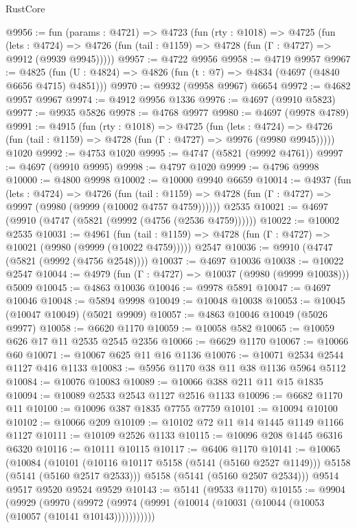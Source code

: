 \begin{lexlean}{RustCore}
\begin{coremodule}
@9956 := fun (params : @4721) =>
  @4723
    (fun (rty : @1018) =>
    @4725
      (fun (lets : @4724) =>
      @4726 (fun (tail : @1159) => @4728 (fun (Γ : @4727) => @9912 (@9939 @9945)))))
@9957 := @4722 @9956
@9958 := @4719 @9957
@9967 := @4825 (fun (U : @4824) => @4826 (fun (t : @7) => @4834 (@4697 (@4840 @6656 @4715) @4851)))
@9970 := @9932 (@9958 @9967) @6654
@9972 := @4682 @9957 @9967
@9974 := @4912 @9956 @1336
@9976 := @4697 (@9910 @5823)
@9977 := @9935 @5826
@9978 := @4768 @9977
@9980 := @4697 (@9978 @4789)
@9991 := @4915
    (fun (rty : @1018) =>
    @4725
      (fun (lets : @4724) =>
      @4726 (fun (tail : @1159) => @4728 (fun (Γ : @4727) => @9976 (@9980 @9945)))))
    @1020
@9992 := @4753 @1020
@9995 := @4747 (@5821 (@9992 @4761))
@9997 := @4697 (@9910 @9995)
@9998 := @4797 @1020
@9999 := @4796 @9998
@10000 := @4800 @9998
@10002 := @10000 @9940 @6659
@10014 := @4937
    (fun (lets : @4724) =>
    @4726
      (fun (tail : @1159) => @4728 (fun (Γ : @4727) => @9997 (@9980 (@9999 (@10002 @4757 @4759))))))
    @2535
@10021 := @4697 (@9910 (@4747 (@5821 (@9992 (@4756 (@2536 @4759))))))
@10022 := @10002 @2535
@10031 := @4961
    (fun (tail : @1159) => @4728 (fun (Γ : @4727) => @10021 (@9980 (@9999 (@10022 @4759)))))
    @2547
@10036 := @9910 (@4747 (@5821 (@9992 (@4756 @2548))))
@10037 := @4697 @10036
@10038 := @10022 @2547
@10044 := @4979 (fun (Γ : @4727) => @10037 (@9980 (@9999 @10038))) @5009
@10045 := @4863 @10036
@10046 := @9978 @5891
@10047 := @4697 @10046
@10048 := @5894 @9998
@10049 := @10048 @10038
@10053 := @10045 (@10047 @10049) (@5021 @9909)
@10057 := @4863 @10046 @10049 (@5026 @9977)
@10058 := @6620 @1170
@10059 := @10058 @582
@10065 := @10059 @626 @17 @11 @2535 @2545 @2356
@10066 := @6629 @1170
@10067 := @10066 @60
@10071 := @10067 @625 @11 @16 @1136
@10076 := @10071 @2534 @2544 @1127 @416 @1133
@10083 := @5956 @1170 @38 @11 @38 @1136 @5964 @5112
@10084 := @10076 @10083
@10089 := @10066 @388 @211 @11 @15 @1835
@10094 := @10089 @2533 @2543 @1127 @2516 @1133
@10096 := @6682 @1170 @11
@10100 := @10096 @387 @1835 @7755 @7759
@10101 := @10094 @10100
@10102 := @10066 @209
@10109 := @10102 @72 @11 @14 @1445 @1149 @1166 @1127
@10111 := @10109 @2526 @1133
@10115 := @10096 @208 @1445 @6316 @6320
@10116 := @10111 @10115
@10117 := @6406 @1170
@10141 := @10065
    (@10084
      (@10101 (@10116 @10117 @5158 (@5141 (@5160 @2527 @1149))) @5158 (@5141 (@5160 @2517 @2533)))
      @5158
      (@5141 (@5160 @2507 @2534)))
    @9514
    @9517
    @9520
    @9524
    @9529
@10143 := @5141 (@9533 @1170)
@10155 := @9904
    (@9929
      (@9970 (@9972 (@9974 (@9991 (@10014 (@10031 (@10044 (@10053 (@10057 (@10141 @10143)))))))))))

\end{coremodule}
\end{lexlean}
